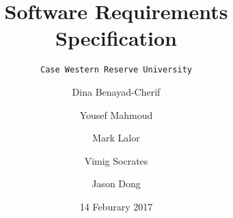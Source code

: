 \documentclass[12pt]{article}
\begin{document}
\title{Software Requirements Specification}

\date{14 Feburary 2017}

\author{
{\tt Case Western Reserve University} \\ \and
Dina Benayad-Cherif \and 
Yousef Mahmoud \and
Mark Lalor \and
Vimig Socrates \and 
Jason Dong}

\maketitle

\section{}
\end{document}
